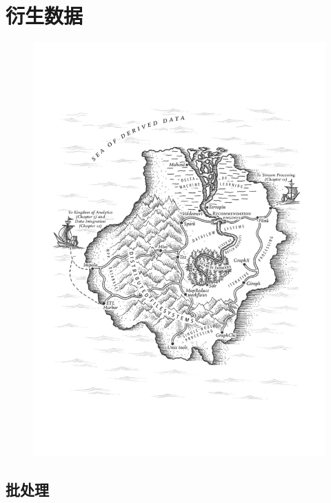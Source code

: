 \documentclass{book}
\begin{document}
\part{衍生数据}
\label{part:part-3}

\newpage
\begin{figure}
  \centering
  \includegraphics[width=\textwidth]{img/ch10.png}
  \label{fig:ch10}
\end{figure}

\chapter{批处理}
\label{ch:ch10}
\end{document}
